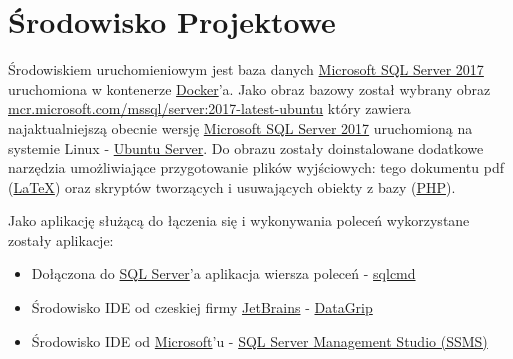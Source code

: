 \section{Środowisko Projektowe}

Środowiskiem uruchomieniowym jest baza danych \href{https://www.microsoft.com/pl-pl/sql-server/sql-server-2017}{Microsoft SQL Server 2017} uruchomiona w kontenerze \href{https://www.docker.com}{Docker}'a. Jako obraz bazowy został wybrany obraz \href{https://hub.docker.com/r/microsoft/mssql-server}{mcr.microsoft.com/mssql/server:2017-latest-ubuntu} który zawiera najaktualniejszą obecnie wersję \href{https://www.microsoft.com/pl-pl/sql-server/sql-server-2017}{Microsoft SQL Server 2017} uruchomioną na systemie Linux - \href{https://www.ubuntu.com/server}{Ubuntu Server}. Do obrazu zostały doinstalowane dodatkowe narzędzia umożliwiające przygotowanie plików wyjściowych: tego dokumentu pdf (\href{https://pl.wikipedia.org/wiki/LaTeX}{LaTeX}) oraz skryptów tworzących i usuwających obiekty z bazy (\href{http://www.php.net}{PHP}).


Jako aplikację służącą do łączenia się i wykonywania poleceń wykorzystane zostały aplikacje: 

\begin{itemize}
\item Dołączona do \href{https://www.microsoft.com/pl-pl/sql-server/sql-server-2017}{SQL Server}'a aplikacja wiersza poleceń - \href{https://docs.microsoft.com/en-us/sql/tools/sqlcmd-utility?view=sql-server-2017}{sqlcmd}
\item Środowisko IDE od czeskiej firmy \href{https://www.jetbrains.com/}{JetBrains} - \href{https://www.jetbrains.com/datagrip/}{DataGrip}
\item Środowisko IDE od \href{https://microsoft.com/}{Microsoft}'u - \href{https://docs.microsoft.com/en-us/sql/ssms/download-sql-server-management-studio-ssms?view=sql-server-2017}{SQL Server Management Studio (SSMS)}
\end{itemize}